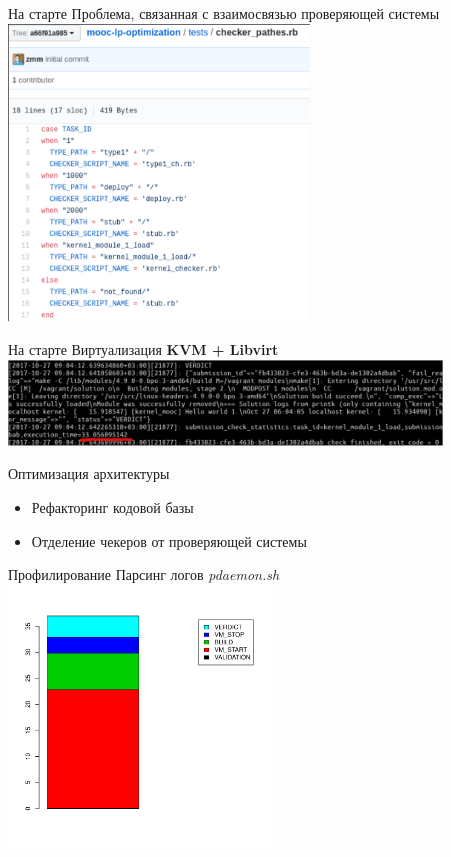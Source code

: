 \documentclass{beamer}
\begin{document}
\begin{frame}{На старте}
	Проблема, связанная с взаимосвязью проверяющей системы
	\includegraphics[width=80mm]{./patchesrb.pdf}
\end{frame}

\begin{frame}{На старте}
	Виртуализация \textbf{KVM + Libvirt}
	\includegraphics[width=115mm]{./length_start.pdf}
\end{frame}

\begin{frame}{Оптимизация архитектуры}
	\begin{itemize}
		\item Рефакторинг кодовой базы
		\item Отделение чекеров от проверяющей системы
	\end{itemize}
\end{frame}

\begin{frame}{Профилирование}
	Парсинг логов \textit{pdaemon.sh}
	\includegraphics[width=70mm]{./libvirt_bar.pdf}
\end{frame}
\end{document}
